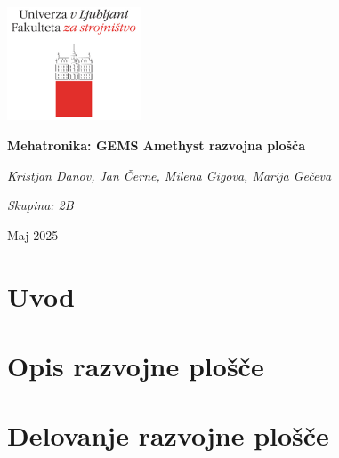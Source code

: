 \documentclass[12pt,a4paper,oneside,fleqn]{book}
\begin{document}
\begin{titlepage}
	\centering
	\includegraphics[width=0.3\textwidth]{Imgs/ULFS.png}\par\vspace{1cm}
	{\huge\bfseries Mehatronika: GEMS Amethyst razvojna plošča\par}
	\vspace{2cm}
	{\Large\itshape Kristjan Danov, Jan Černe, Milena Gigova, Marija Gečeva\par}
    {\Large\itshape Skupina: 2B\par}
	\vfill
    {\large Maj 2025\par}
\end{titlepage}

\tableofcontents
\newpage

\chapter{Uvod}
    

\cleardoublepage
{}
\setcounter{page}{1}

\chapter{Opis razvojne plošče}
    

\chapter{Delovanje razvojne plošče}
    
\end{document}
